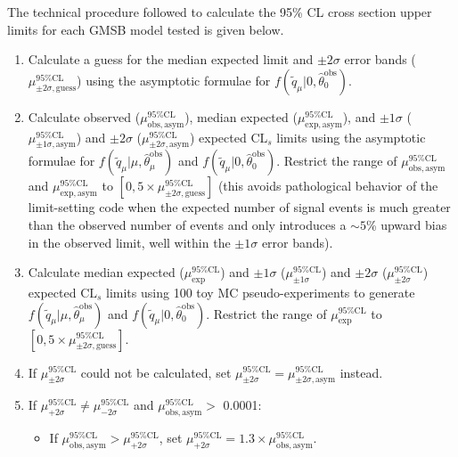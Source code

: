 \documentclass[dissertation.tex]{subfiles}
\begin{document}
The technical procedure followed to calculate the 95\% CL cross section upper limits for each GMSB model tested is given below.

\begin{enumerate}
\item Calculate a guess for the median expected limit and $\pm2\sigma$ error bands ($\mu^{95\%\mathrm{CL}}_{\pm2\sigma\mathrm{,guess}}$) using the asymptotic formulae for $f(\tilde{q}_{\mu} | 0, \hat{\theta}_{0}^{\mathrm{obs}})$.
\item Calculate observed ($\mu^{95\%\mathrm{CL}}_{\mathrm{obs,asym}}$), median expected ($\mu^{95\%\mathrm{CL}}_{\mathrm{exp,asym}}$), and $\pm1\sigma$ ($\mu^{95\%\mathrm{CL}}_{\pm1\sigma\mathrm{,asym}}$) and $\pm2\sigma$ ($\mu^{95\%\mathrm{CL}}_{\pm2\sigma\mathrm{,asym}}$) expected $\mbox{CL}_{s}$ limits using the asymptotic formulae for $f(\tilde{q}_{\mu} | \mu, \hat{\theta}_{\mu}^{\mathrm{obs}})$ and $f(\tilde{q}_{\mu} | 0, \hat{\theta}_{0}^{\mathrm{obs}})$.  Restrict the range of $\mu^{95\%\mathrm{CL}}_{\mathrm{obs,asym}}$ and $\mu^{95\%\mathrm{CL}}_{\mathrm{exp,asym}}$ to $\left[0, 5\times\mu^{95\%\mathrm{CL}}_{\pm2\sigma\mathrm{,guess}}\right]$ (this avoids pathological behavior of the limit-setting code when the expected number of signal events is much greater than the observed number of events and only introduces a $\sim5$\% upward bias in the observed limit, well within the $\pm1\sigma$ error bands).
\item Calculate median expected ($\mu^{95\%\mathrm{CL}}_{\mathrm{exp}}$) and $\pm1\sigma$ ($\mu^{95\%\mathrm{CL}}_{\pm1\sigma}$) and $\pm2\sigma$ ($\mu^{95\%\mathrm{CL}}_{\pm2\sigma}$) expected $\mbox{CL}_{s}$ limits using 100 toy MC pseudo-experiments to generate $f(\tilde{q}_{\mu} | \mu, \hat{\theta}_{\mu}^{\mathrm{obs}})$ and $f(\tilde{q}_{\mu} | 0, \hat{\theta}_{0}^{\mathrm{obs}})$.  Restrict the range of $\mu^{95\%\mathrm{CL}}_{\mathrm{exp}}$ to $\left[0, 5\times\mu^{95\%\mathrm{CL}}_{\pm2\sigma\mathrm{,guess}}\right]$.
\item If $\mu^{95\%\mathrm{CL}}_{\pm2\sigma}$ could not be calculated, set $\mu^{95\%\mathrm{CL}}_{\pm2\sigma} = \mu^{95\%\mathrm{CL}}_{\pm2\sigma\mathrm{,asym}}$ instead.
\item If $\mu^{95\%\mathrm{CL}}_{+2\sigma} \neq \mu^{95\%\mathrm{CL}}_{-2\sigma}$ and $\mu^{95\%\mathrm{CL}}_{\mathrm{obs,asym}} >$ 0.0001:
\begin{itemize}
\item If $\mu^{95\%\mathrm{CL}}_{\mathrm{obs,asym}} > \mu^{95\%\mathrm{CL}}_{+2\sigma}$, set $\mu^{95\%\mathrm{CL}}_{+2\sigma} = 1.3\times\mu^{95\%\mathrm{CL}}_{\mathrm{obs,asym}}$.

\end{itemize}
\end{enumerate}
\end{document}
